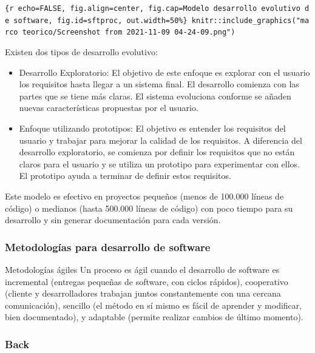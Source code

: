 \documentclass[11pt]{article}
\providecommand{\tightlist}{%
      \setlength{\itemsep}{0pt}\setlength{\parskip}{0pt}}
\begin{document}
\texttt{\{r\ echo=FALSE,\ fig.align=\textquotesingle{}center\textquotesingle{},\ fig.cap=\textquotesingle{}Modelo\ desarrollo\ evolutivo\ de\ software\textquotesingle{},\ fig.id=\textquotesingle{}sftproc\textquotesingle{},\ out.width=\textquotesingle{}50\%\textquotesingle{}\}\ knitr::include\_graphics("marco\ teorico/Screenshot\ from\ 2021-11-09\ 04-24-09.png")}

Existen dos tipos de desarrollo evolutivo:

\begin{itemize}
\tightlist
\item
  Desarrollo Exploratorio: El objetivo de este enfoque es explorar con
  el usuario los requisitos hasta llegar a un sistema final. El
  desarrollo comienza con las partes que se tiene más claras. El sistema
  evoluciona conforme se añaden nuevas características propuestas por el
  usuario.
\item
  Enfoque utilizando prototipos: El objetivo es entender los requisitos
  del usuario y trabajar para mejorar la calidad de los requisitos. A
  diferencia del desarrollo exploratorio, se comienza por definir los
  requisitos que no están claros para el usuario y se utiliza un
  prototipo para experimentar con ellos. El prototipo ayuda a terminar
  de definir estos requisitos.
\end{itemize}

Este modelo es efectivo en proyectos pequeños (menos de 100.000 líneas
de código) o medianos (hasta 500.000 líneas de código) con poco tiempo
para su desarrollo y sin generar documentación para cada versión.

\hypertarget{metodologuxedas-para-desarrollo-de-software}{%
\subsubsection{Metodologías para desarrollo de
software}\label{metodologuxedas-para-desarrollo-de-software}}

Metodologías ágiles Un proceso es ágil cuando el desarrollo de software
es incremental (entregas pequeñas de software, con ciclos rápidos),
cooperativo (cliente y desarrolladores trabajan juntos constantemente
con una cercana comunicación), sencillo (el método en sí mismo es fácil
de aprender y modificar, bien documentado), y adaptable (permite
realizar cambios de último momento).

\hypertarget{back}{%
\subsubsection{Back}\label{back}}
\end{document}
